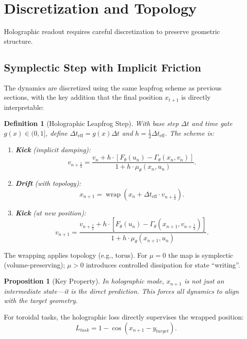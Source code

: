 \documentclass[12pt,letterpaper,twoside]{article}
\newtheorem{definition}{Definition}[section]
\newtheorem{prop}{Proposition}[section]
\begin{document}
\section{Discretization and Topology}

Holographic readout requires careful discretization to preserve geometric structure.

\subsection{Symplectic Step with Implicit Friction}

The dynamics are discretized using the same leapfrog scheme as previous sections, with the key addition that the final position $x_{t+1}$ is directly interpretable:

\begin{definition}[Holographic Leapfrog Step]
With base step $\Delta t$ and time gate $g(x) \in (0, 1]$, define $\Delta t_{\text{eff}} = g(x) \Delta t$ and $h = \frac{1}{2} \Delta t_{\text{eff}}$. The scheme is:

\begin{enumerate}
\item \textbf{Kick} (implicit damping):
\[
v_{n+\frac{1}{2}} = \frac{v_n + h \cdot [F_\theta(u_n) - \Gamma_\theta(x_n, v_n)]}{1 + h \cdot \mu_\theta(x_n, u_n)}.
\]

\item \textbf{Drift} (with topology):
\[
x_{n+1} = \operatorname{wrap}\!\left(x_n + \Delta t_{\text{eff}} \cdot v_{n+\frac{1}{2}}\right).
\]

\item \textbf{Kick} (at new position):
\[
v_{n+1} = \frac{v_{n+\frac{1}{2}} + h \cdot [F_\theta(u_n) - \Gamma_\theta(x_{n+1}, v_{n+\frac{1}{2}})]}{1 + h \cdot \mu_\theta(x_{n+1}, u_n)}.
\]
\end{enumerate}
\end{definition}

The wrapping applies topology (e.g., torus). For $\mu = 0$ the map is symplectic (volume-preserving); $\mu > 0$ introduces controlled dissipation for state ``writing''.

\begin{prop}[Key Property]
In holographic mode, $x_{n+1}$ is not just an intermediate state---it is the direct prediction. This forces all dynamics to align with the target geometry.
\end{prop}

For toroidal tasks, the holographic loss directly supervises the wrapped position:
\[
L_{task} = 1 - \cos(x_{n+1} - y_{target}).
\]
\end{document}

